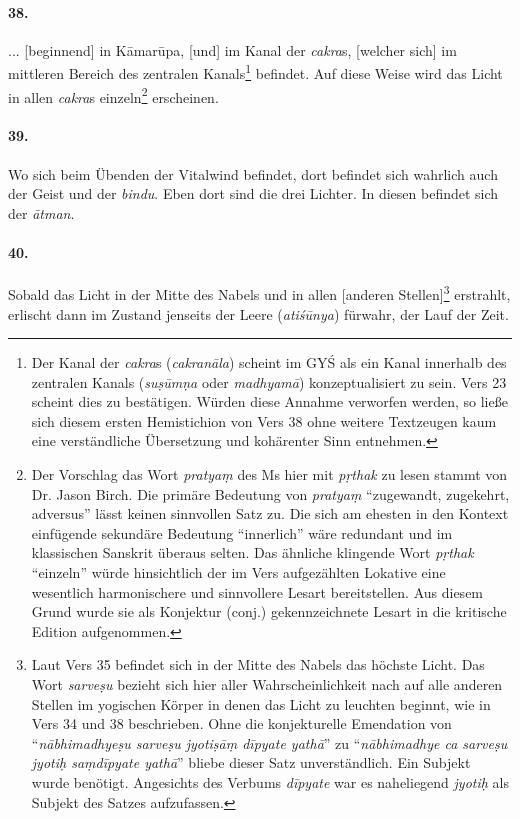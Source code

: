\documentclass[a4paper,12pt]{article}
\begin{document}
\paragraph{38.} ... [beginnend] in Kāmarūpa, [und] im Kanal der \textit{cakra}s, [welcher sich] im mittleren Bereich des zentralen Kanals\footnote{Der Kanal der \textit{cakra}s (\textit{cakranāla}) scheint im GYŚ als ein Kanal innerhalb des zentralen Kanals (\textit{suṣūmṇa} oder \textit{madhyamā}) konzeptualisiert zu sein. Vers 23 scheint dies zu bestätigen. Würden diese Annahme verworfen werden, so ließe sich diesem ersten Hemistichion von Vers 38 ohne weitere Textzeugen kaum eine verständliche Übersetzung und kohärenter Sinn entnehmen.} befindet. Auf diese Weise wird das Licht in allen \textit{cakra}s einzeln\footnote{Der Vorschlag das Wort \textit{pratyaṃ} des Ms hier mit \textit{pṛthak} zu lesen stammt von Dr. Jason Birch. Die primäre Bedeutung von \textit{pratyaṃ} ``zugewandt, zugekehrt, adversus'' lässt keinen sinnvollen Satz zu. Die sich am ehesten in den Kontext einfügende sekundäre Bedeutung ``innerlich'' wäre redundant und im klassischen Sanskrit überaus selten. Das ähnliche klingende Wort \textit{pṛthak} ``einzeln'' würde hinsichtlich der im Vers aufgezählten Lokative eine wesentlich harmonischere und sinnvollere Lesart bereitstellen. Aus diesem Grund wurde sie als Konjektur (conj.) gekennzeichnete Lesart in die kritische Edition aufgenommen.} erscheinen.

\paragraph{39.} Wo sich beim Übenden der Vitalwind befindet, dort befindet sich wahrlich auch der Geist und der \textit{bindu}. Eben dort sind die drei Lichter. In diesen befindet sich der \textit{ātman}.

\paragraph{40.} Sobald das Licht in der Mitte des Nabels und in allen [anderen Stellen]\footnote{Laut Vers 35 befindet sich in der Mitte des Nabels das höchste Licht. Das Wort \textit{sarveṣu} bezieht sich hier aller Wahrscheinlichkeit nach auf alle anderen Stellen im yogischen Körper in denen das Licht zu leuchten beginnt, wie in Vers 34 und 38 beschrieben. Ohne die konjekturelle Emendation von ``\textit{nābhimadhyeṣu sarveṣu jyotiṣāṃ dīpyate yathā}'' zu ``\textit{nābhimadhye ca sarveṣu jyotiḥ saṃdīpyate yathā}'' bliebe dieser Satz unverständlich. Ein Subjekt wurde benötigt. Angesichts des Verbums \textit{dīpyate} war es naheliegend \textit{jyotiḥ} als Subjekt des Satzes aufzufassen.} erstrahlt, erlischt dann im Zustand jenseits der Leere (\textit{atiśūnya}) fürwahr, der Lauf der Zeit. 
\end{document}

